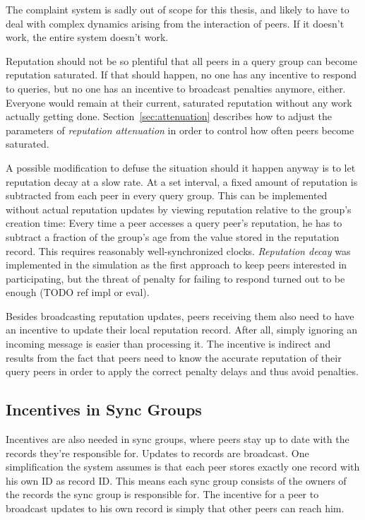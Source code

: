 The complaint system is sadly out of scope for this thesis, and likely to have
to deal with complex dynamics arising from the interaction of peers. If it
doesn't work, the entire system doesn't work.

Reputation should not be so plentiful that all peers in a query group can become
reputation saturated. If that should happen, no one has any incentive to respond
to queries, but no one has an incentive to broadcast penalties anymore, either.
Everyone would remain at their current, saturated reputation without any work
actually getting done. Section~\ref{sec:attenuation} describes how to adjust the
parameters of \emph{reputation attenuation} in order to control how often peers
become saturated.

A possible modification to defuse the situation should it happen anyway is to
let reputation decay at a slow rate. At a set interval, a fixed amount of
reputation is subtracted from each peer in every query group. This can be
implemented without actual reputation updates by viewing reputation relative to
the group's creation time: Every time a peer accesses a query peer's reputation,
he has to subtract a fraction of the group's age from the value stored in the
reputation record. This requires reasonably well-synchronized clocks.
\emph{Reputation decay} was implemented in the simulation as the first approach
to keep peers interested in participating, but the threat of penalty for failing
to respond turned out to be enough (TODO ref impl or eval).

Besides broadcasting reputation updates, peers receiving them also need to have
an incentive to update their local reputation record. After all, simply ignoring
an incoming message is easier than processing it. The incentive is indirect and
results from the fact that peers need to know the accurate reputation of their
query peers in order to apply the correct penalty delays and thus avoid
penalties.

\subsection{Incentives in Sync Groups}
\label{sec:desc_incentives_sync}
Incentives are also needed in sync groups, where peers stay up to date with the
records they're responsible for. Updates to records are broadcast. One
simplification the system assumes is that each peer stores exactly one record
with his own ID as record ID. This means each sync group consists of the owners
of the records the sync group is responsible for. The incentive for a peer to
broadcast updates to his own record is simply that other peers can reach him.

